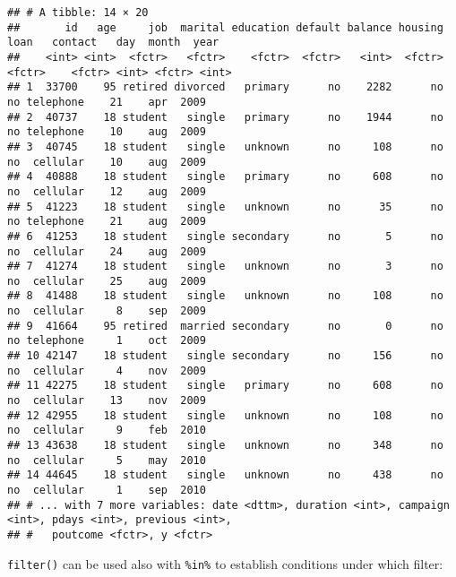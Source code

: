 \documentclass[]{book}
\newenvironment{Shaded}{\begin{snugshade}}{\end{snugshade}}
\newcommand{\KeywordTok}[1]{\textcolor[rgb]{0.13,0.29,0.53}{\textbf{{#1}}}}
\newcommand{\DecValTok}[1]{\textcolor[rgb]{0.00,0.00,0.81}{{#1}}}
\newcommand{\StringTok}[1]{\textcolor[rgb]{0.31,0.60,0.02}{{#1}}}
\newcommand{\CommentTok}[1]{\textcolor[rgb]{0.56,0.35,0.01}{\textit{{#1}}}}
\newcommand{\NormalTok}[1]{{#1}}
\begin{document}
\begin{verbatim}
## # A tibble: 14 × 20
##       id   age     job  marital education default balance housing   loan   contact   day  month  year
##    <int> <int>  <fctr>   <fctr>    <fctr>  <fctr>   <int>  <fctr> <fctr>    <fctr> <int> <fctr> <int>
## 1  33700    95 retired divorced   primary      no    2282      no     no telephone    21    apr  2009
## 2  40737    18 student   single   primary      no    1944      no     no telephone    10    aug  2009
## 3  40745    18 student   single   unknown      no     108      no     no  cellular    10    aug  2009
## 4  40888    18 student   single   primary      no     608      no     no  cellular    12    aug  2009
## 5  41223    18 student   single   unknown      no      35      no     no telephone    21    aug  2009
## 6  41253    18 student   single secondary      no       5      no     no  cellular    24    aug  2009
## 7  41274    18 student   single   unknown      no       3      no     no  cellular    25    aug  2009
## 8  41488    18 student   single   unknown      no     108      no     no  cellular     8    sep  2009
## 9  41664    95 retired  married secondary      no       0      no     no telephone     1    oct  2009
## 10 42147    18 student   single secondary      no     156      no     no  cellular     4    nov  2009
## 11 42275    18 student   single   primary      no     608      no     no  cellular    13    nov  2009
## 12 42955    18 student   single   unknown      no     108      no     no  cellular     9    feb  2010
## 13 43638    18 student   single   unknown      no     348      no     no  cellular     5    may  2010
## 14 44645    18 student   single   unknown      no     438      no     no  cellular     1    sep  2010
## # ... with 7 more variables: date <dttm>, duration <int>, campaign <int>, pdays <int>, previous <int>,
## #   poutcome <fctr>, y <fctr>
\end{verbatim}

\texttt{filter()} can be used also with \texttt{\%in\%} to establish
conditions under which filter:

\begin{Shaded}
\end{Shaded}
\end{document}
